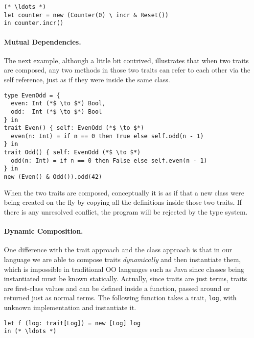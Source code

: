 \begin{lstlisting}
(* \ldots *)
let counter = new (Counter(0) \ incr & Reset())
in counter.incr()
\end{lstlisting}

\paragraph{Mutual Dependencies.}
The next example, although a little bit contrived, illustrates that when two
traits are composed, any two methods in those two traits can refer to each
other via the self reference, just as if they were inside the same class.

\begin{lstlisting}
type EvenOdd = {
  even: Int (*$ \to $*) Bool,
  odd:  Int (*$ \to $*) Bool
} in
trait Even() { self: EvenOdd (*$ \to $*)
  even(n: Int) = if n == 0 then True else self.odd(n - 1)
} in
trait Odd() { self: EvenOdd (*$ \to $*)
  odd(n: Int) = if n == 0 then False else self.even(n - 1)
} in
new (Even() & Odd()).odd(42)
\end{lstlisting}

When the two traits are composed, conceptually it is as if that a new class were
being created on the fly by copying all the definitions inside those two traits.
If there is any unresolved conflict, the program will be rejected by the type
system.

\paragraph{Dynamic Composition.}

One difference with the trait approach and the class approach is that in our
language we are able to compose traits \emph{dynamically} and then instantiate
them, which is impossible in traditional OO languages such as Java since classes
being instantiated must be known statically. Actually, since traits are just
terms, traits are first-class values and can be defined inside a function,
passed around or returned just as normal terms. The following function takes a
trait, \lstinline$log$, with unknown implementation and instantiate it.

\begin{lstlisting}
let f (log: trait[Log]) = new [Log] log
in (* \ldots *)
\end{lstlisting}

